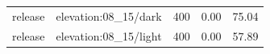 \begin{longtable}{l>{\raggedright\arraybackslash}p{.42\linewidth}rrr}
\endhead
\bottomrule\endfoot
release & %
elevation:08\_\allowbreak{}15/dark & %
400 & %
0.00 & %
75.04 \\ %

release & %
elevation:08\_\allowbreak{}15/light & %
400 & %
0.00 & %
57.89 \\ %


\end{longtable}
